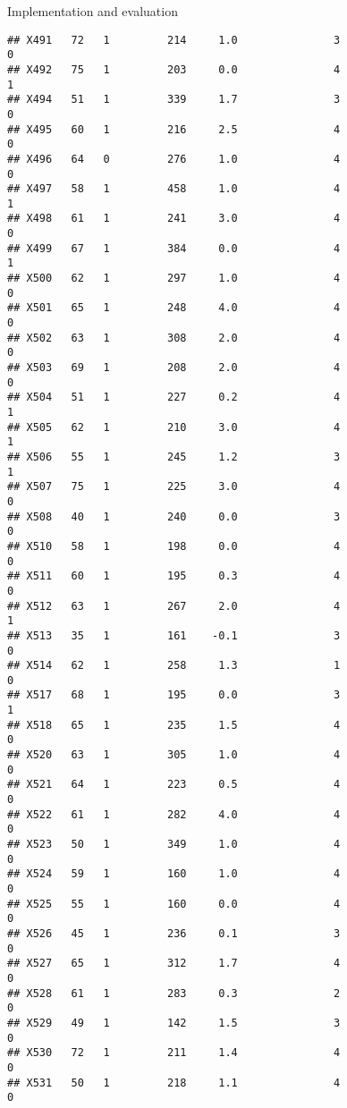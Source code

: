 \documentclass[
  ignorenonframetext,
]{beamer}
\begin{document}
\begin{frame}[fragile]{Implementation and evaluation}
\begin{verbatim}
## X491   72   1         214     1.0               3                   0
## X492   75   1         203     0.0               4                   1
## X494   51   1         339     1.7               3                   0
## X495   60   1         216     2.5               4                   0
## X496   64   0         276     1.0               4                   0
## X497   58   1         458     1.0               4                   1
## X498   61   1         241     3.0               4                   0
## X499   67   1         384     0.0               4                   1
## X500   62   1         297     1.0               4                   0
## X501   65   1         248     4.0               4                   0
## X502   63   1         308     2.0               4                   0
## X503   69   1         208     2.0               4                   0
## X504   51   1         227     0.2               4                   1
## X505   62   1         210     3.0               4                   1
## X506   55   1         245     1.2               3                   1
## X507   75   1         225     3.0               4                   0
## X508   40   1         240     0.0               3                   0
## X510   58   1         198     0.0               4                   0
## X511   60   1         195     0.3               4                   0
## X512   63   1         267     2.0               4                   1
## X513   35   1         161    -0.1               3                   0
## X514   62   1         258     1.3               1                   0
## X517   68   1         195     0.0               3                   1
## X518   65   1         235     1.5               4                   0
## X520   63   1         305     1.0               4                   0
## X521   64   1         223     0.5               4                   0
## X522   61   1         282     4.0               4                   0
## X523   50   1         349     1.0               4                   0
## X524   59   1         160     1.0               4                   0
## X525   55   1         160     0.0               4                   0
## X526   45   1         236     0.1               3                   0
## X527   65   1         312     1.7               4                   0
## X528   61   1         283     0.3               2                   0
## X529   49   1         142     1.5               3                   0
## X530   72   1         211     1.4               4                   0
## X531   50   1         218     1.1               4                   0

\end{verbatim}
\end{frame}
\end{document}
